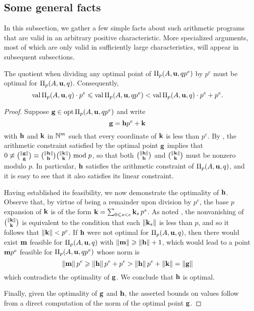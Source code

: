 \documentclass[11pt]{amsart}
\begin{document}
\subsection{Some general facts}

In this subsection, we gather a few simple facts about such arithmetic programs that are valid in an arbitrary positive characteristic.  More specialized arguments, most of which are only valid in sufficiently large characteristics, will appear in subsequent subsections.  

\begin{lemma}
 \label{optimal division: L}
 The quotient when dividing any optimal point of $\Pi_p(A, \mathbf{u}, qp^e)$ by $p^e$ must be optimal for $\Pi_p(A, \mathbf{u}, q)$.  Consequently,    
 \[ \operatorname{val} \Pi_p(A, \mathbf{u}, q) \cdot p^e \leqslant \operatorname{val} \Pi_p(A, \mathbf{u}, qp^e) < \operatorname{val} \Pi_p(A, \mathbf{u}, q) \cdot p^e +p^e. \]
\end{lemma}

\begin{proof}  Suppose $\mathbf{g} \in \operatorname{opt} \Pi_p(A, \mathbf{u}, qp^e)$ and write
\[ \mathbf{g} = \mathbf{h} p^e + \mathbf{k} \]
with $\mathbf{h}$ and $\mathbf{k}$ in $\mathbb{N}^m$ such that every coordinate of $\mathbf{k}$ is less than $p^e$.  
By , the arithmetic constraint satisfied by the optimal point $\mathbf{g}$ implies that $0 \not \equiv \binom{\| \mathbf{g} \|}{\mathbf{g}} \equiv \binom{\| \mathbf{h} \|}{\mathbf{h}} \binom{\| \mathbf{k} \|}{\mathbf{k}} \bmod p$, so that both $\binom{\| \mathbf{h} \|}{\mathbf{h}}$ and $\binom{\| \mathbf{k} \|}{\mathbf{k}}$ must be nonzero modulo $p$.  In particular, $\mathbf{h}$ satisfies the arithmetic constraint of $\Pi_p(A,\mathbf{u},q)$, and it is easy to see that it also satisfies its linear constraint.

Having established its feasibility, we now demonstrate the optimality of $\mathbf{h}$.  Observe that, by virtue of being a remainder upon division by $p^e$, the base $p$ expansion of $\mathbf{k}$ is of the form $\mathbf{k} = \sum_{0 \leqslant s < e} \mathbf{k}_s \, p^s$.  As noted , the nonvanishing of $\binom{\| \mathbf{k} \|}{\mathbf{k}}$ is equivalent to the condition that each $\| \mathbf{k}_s \|$ is less than $p$, and so it follows that $\| \mathbf{k} \| < p^e$.  If $\mathbf{h}$ were not optimal for $\Pi_p(A, \mathbf{u}, q)$, then there would exist $\mathbf{m}$ feasible for $\Pi_p(A, \mathbf{u}, q)$ with $\| \mathbf{m} \| \geqslant \| \mathbf{h} \| + 1$, which would lead to a point $\mathbf{m}p^e$ feasible for $\Pi_p(A, \mathbf{u}, qp^e)$ whose norm is \[ \| \mathbf{m} \| \, p^e \geqslant \| \mathbf{h} \| \, p^e + p^e >  \| \mathbf{h} \| \, p^e + \| \mathbf{k} \| = \| \mathbf{g} \|\] which contradicts the optimality of $\mathbf{g}$. We conclude that $\mathbf{h}$ is optimal.

Finally, given the optimality of $\mathbf{g}$ and $\mathbf{h}$, the asserted bounds on values follow from a direct computation of the norm of the optimal point $\mathbf{g}$.
\end{proof}
\end{document}
